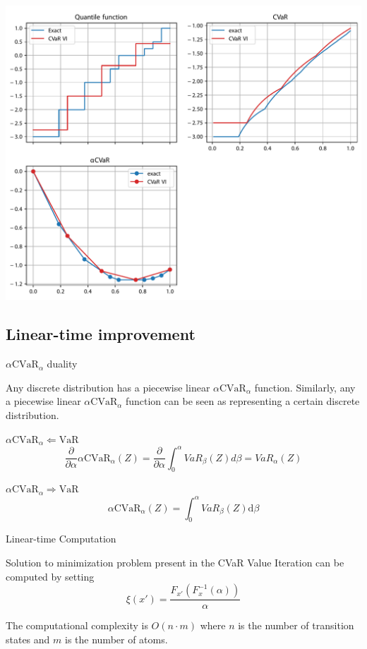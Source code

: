 \documentclass{beamer}
\newcommand{\cvar}{\text{CVaR}}
\newcommand{\var}{\text{VaR}}
\newcommand{\dt}{\text{d}}
\begin{document}
\begin{frame}
\center
\includegraphics[width=0.8\linewidth]{../gfx/exactvarcvar.pdf}
\end{frame}



\subsection{Linear-time improvement}

\begin{frame}{$\alpha\cvar_\alpha$ duality}
\begin{lemma}
Any discrete distribution has a piecewise linear $\alpha\cvar_\alpha$ function. Similarly, any a piecewise linear $\alpha\cvar_\alpha$ function can be seen as representing a certain discrete distribution.
\end{lemma}

\begin{block}{$\alpha\cvar_\alpha 	\Leftarrow \var$}
$$\dfrac{\partial}{\partial \alpha} \alpha \cvar_\alpha(Z) = \dfrac{\partial}{\partial \alpha} \int_0^\alpha VaR_\beta(Z) d\beta = VaR_\alpha(Z)$$
\end{block}


\begin{block}{$\alpha\cvar_\alpha 	\Rightarrow \var$}
$$\alpha \cvar_\alpha(Z) = \int_0^\alpha VaR_\beta(Z) \dt \beta$$
\end{block}

\end{frame}


\begin{frame}{Linear-time Computation}

\begin{theorem}
Solution to minimization problem present in the CVaR Value Iteration can be computed by setting
$$\xi ( x' ) = \dfrac{F_{x'}(F^{-1}_x(\alpha))}{\alpha} $$

The computational complexity is $O(n\cdot m)$ where $n$ is the number of transition states and $m$ is the number of atoms.
\end{theorem}
\end{frame}
\end{document}
